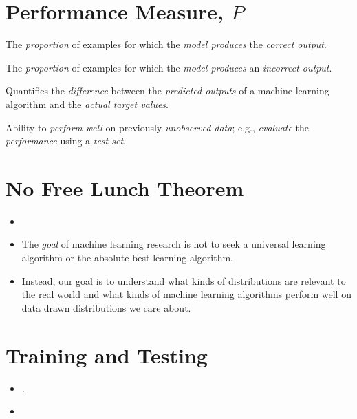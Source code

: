 \documentclass[
	number={1},
	title={Machine Learning Fundamentals}
]{cs584notes}
\begin{document}
\section{Performance Measure, $P$}\label{sec:performance-measure-$p$}
\begin{description}[font=\color{emphblue}]
	\item[Accuracy:] The \emph{proportion} of examples for which the \emph{model produces} the \emph{correct output}.
	\item[Error rate:] The \emph{proportion} of examples for which the \emph{model produces} an \emph{incorrect output}.
	\item[Loss function:] Quantifies the \emph{difference} between the \emph{predicted outputs} of a machine learning algorithm and the \emph{actual target values}.
	\item[Generalization] Ability to \emph{perform well} on previously \emph{unobserved data}; e.g., \emph{evaluate} the \emph{performance} using a \emph{test set}.
\end{description}

\section{No Free Lunch Theorem}\label{sec:no-free-lunch-theorem}
\begin{itemize}
	\item {}
	\item The \emph{goal} of machine learning research is not to seek a universal learning algorithm or the absolute best learning algorithm.
	\item Instead, our goal is to understand what kinds of distributions are relevant to the real world and what kinds of machine learning algorithms perform well on data drawn distributions we care about.
\end{itemize}

\section{Training and Testing}\label{sec:training-and-testing}
\begin{itemize}
	\item {}.
	\item {}
\end{itemize}
\end{document}
